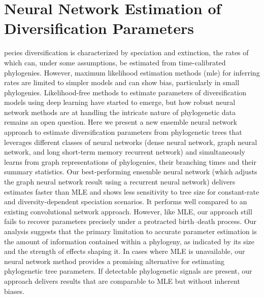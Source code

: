 \chapter{Neural Network Estimation of Diversification Parameters}
\label{chapter2}

pecies diversification is characterized by speciation and extinction, the rates of which can, under some assumptions, be estimated from time-calibrated phylogenies. However, maximum likelihood estimation methods (\acrshort{mle}) for inferring rates are limited to simpler models and can show bias, particularly in small phylogenies. Likelihood-free methods to estimate parameters of diversification models using deep learning have started to emerge, but how robust neural network methods are at handling the intricate nature of phylogenetic data remains an open question. Here we present a new ensemble neural network approach to estimate diversification parameters from phylogenetic trees that leverages different classes of neural networks (dense neural network, graph neural network, and long short-term memory recurrent network) and simultaneously learns from graph representations of phylogenies, their branching times and their summary statistics. Our best-performing ensemble neural network (which adjusts the graph neural network result using a recurrent neural network) delivers estimates faster than MLE and shows less sensitivity to tree size for constant-rate and diversity-dependent speciation scenarios. It performs well compared to an existing convolutional network approach. However, like MLE, our approach still fails to recover parameters precisely under a protracted birth--death process. Our analysis suggests that the primary limitation to accurate parameter estimation is the amount of information contained within a phylogeny, as indicated by its size and the strength of effects shaping it. In cases where MLE is unavailable, our neural network method provides a promising alternative for estimating phylogenetic tree parameters. If detectable phylogenetic signals are present, our approach delivers results that are comparable to MLE but without inherent biases.

